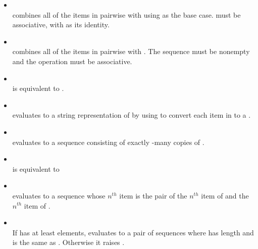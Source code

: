 \begin{itemize}
\item {}\\  combines all of the items in 
  pairwise with  using  as the base case.  must be
  associative, with  as its identity.

\item {}\\  combines all of the items in 
  pairwise with .  The sequence  must be nonempty and
  the operation  must be associative.

\item {}\\  is equivalent to
  .

\item {}\\  evaluates to a string
  representation of  by using  to convert each item in
   to a .

\item {}\\  evaluates to a sequence consisting of exactly -many copies
  of .

\item {}\\  is equivalent to 

\item {}\\  evaluates to a sequence whose
  $n^{th}$ item is the pair of the $n^{th}$ item of  and the
  $n^{th}$ item of .

\item {}\\ If  has at least  elements, 
  evaluates to a pair of sequences
   where  has length  and 
  is the same as . Otherwise it raises .


\end{itemize}
